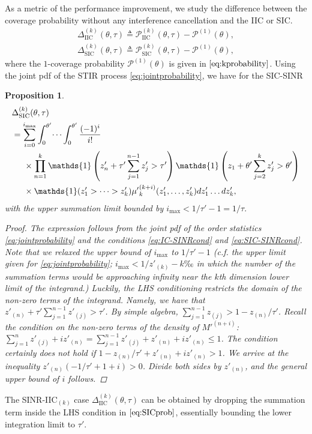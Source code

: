 \documentclass[lettersize,journal]{IEEEtran}
\newtheorem{prop}[theorem]{Proposition}
\begin{document}
 As a metric of the performance improvement, we study the difference between the coverage probability without any interference cancellation and the IIC or SIC. 
\begin{align}
  \Delta^{(k)}_{\text{IIC}}(\theta,\tau) \triangleq \mathcal{P}^{(k)}_{\text{IIC}}(\theta,\tau)- \mathcal{P}^{(1)}(\theta),\nonumber\\
  \Delta^{(k)}_{\text{SIC}}(\theta,\tau) \triangleq \mathcal{P}^{(k)}_{\text{SIC}}(\theta,\tau)- \mathcal{P}^{(1)}(\theta),
\end{align}
where the $1$-coverage probability  $\mathcal{P}^{(1)}(\theta)$ is given in $\eqref{eq:kprobability}$. Using the joint pdf of the STIR process \eqref{eq:jointprobability}, we have for the SIC-SINR
\begin{prop}
  \begin{align}
    \label{eq:SICprob}
    & \Delta^{(k)}_{\text{SIC}}(\theta,\tau) \nonumber\\
    &=\sum^{i_{\text{max}}}_{i=0} \int_{0}^{\theta'} \dots \int_{0}^{\theta'}\frac{(-1)^i}{i!}\nonumber \\
    & \hspace{0.5cm}\times \prod_{n=1}^k\mathds{1}\left( z'_n+ \tau'\sum_{j=1}^{n-1} z'_j>\tau' \right)  \mathds{1}\left(z_1+  \theta'\sum_{j=2}^k z'_j>\theta' \right) \nonumber \\
    &\hspace{0.5cm} \times \mathds{1}(z'_1>\dots>z'_k){\mu'}_k^{(k+i)}(z'_1,\dots,z'_k) d z'_1 \dots d z'_k,
  \end{align}
  with the upper summation limit bounded by $i_{\text{max}} < 1/\tau'-1=1/\tau.$ 
  \begin{proof}
    The expression follows from the joint pdf of the order statistics \eqref{eq:jointprobability} and the conditions \eqref{eq:IC-SINRcond} and \eqref{eq:SIC-SINRcond}. Note that we relaxed the upper bound of  $i_{\text{max}}$ to $1/\tau'-1$ (c.f. the upper limit given for \eqref{eq:jointprobability}; $i_{\text{max}} < 1/z'_{(k)}-k‰$ in which the number of the summation terms would be approaching infinity near the $k$\textit{th} dimension lower limit of the integrand.) Luckily, the LHS conditioning restricts the domain of the non-zero terms of the integrand. Namely, we have that $z'_{(n)}+\tau'\sum_{j=1}^{n-1}z'_{(j)}>\tau'$. By simple algebra, $\sum_{j=1}^{n-1}z_{(j)}> 1-z_{(n)}/\tau'$. Recall the condition on the non-zero terms of the density of $M'^{(n+i)}$:  $\sum_{j=1}^n z'_{(j)}+i z'_{(n)} =\sum_{j=1}^{n-1}z'_{(j)} +z'_{(n)}+i z'_{(n)}  \leq 1$. The condition certainly \textit{does not} hold if $1-z_{(n)}/\tau'+ z'_{(n)}+i z'_{(n)}>1$. We arrive at the inequality $z'_{(n)} \left(-1/\tau' + 1 +i \right)>0$. Divide both sides by $z'_{(n)}$, and the general upper bound of $i$ follows.
  \end{proof}
\end{prop}
The SINR-IIC$_{(k)}$ case $\Delta^{(k)}_{\text{IIC}}(\theta,\tau)$ can be obtained by dropping the summation term inside the LHS condition in $\eqref{eq:SICprob}$, essentially bounding the lower integration limit to $\tau'$.
\end{document}
